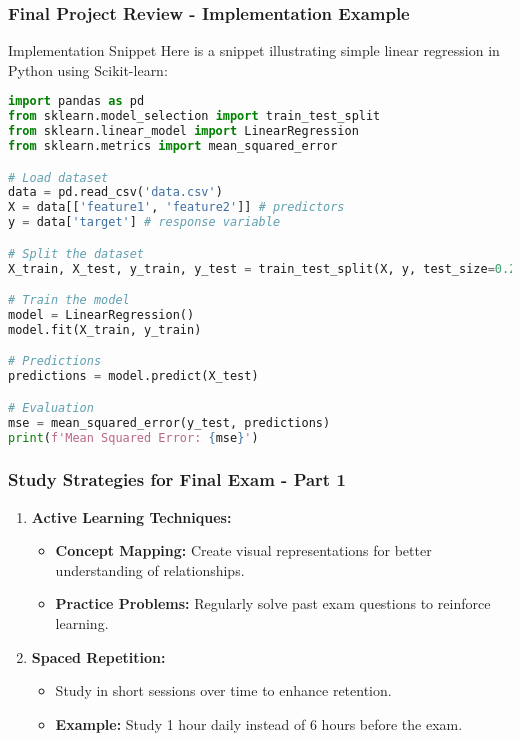 \documentclass{beamer}
\begin{document}
\begin{frame}[fragile]
    \frametitle{Final Project Review - Implementation Example}
    \begin{block}{Implementation Snippet}
        Here is a snippet illustrating simple linear regression in Python using Scikit-learn:
    \end{block}
    \begin{lstlisting}[language=Python]
import pandas as pd
from sklearn.model_selection import train_test_split
from sklearn.linear_model import LinearRegression
from sklearn.metrics import mean_squared_error

# Load dataset
data = pd.read_csv('data.csv')
X = data[['feature1', 'feature2']] # predictors
y = data['target'] # response variable

# Split the dataset
X_train, X_test, y_train, y_test = train_test_split(X, y, test_size=0.2)

# Train the model
model = LinearRegression()
model.fit(X_train, y_train)

# Predictions
predictions = model.predict(X_test)

# Evaluation
mse = mean_squared_error(y_test, predictions)
print(f'Mean Squared Error: {mse}')
    \end{lstlisting}
\end{frame}

\begin{frame}[fragile]
    \frametitle{Study Strategies for Final Exam - Part 1}
    \begin{enumerate}
        \item \textbf{Active Learning Techniques:}
            \begin{itemize}
                \item \textbf{Concept Mapping:} Create visual representations for better understanding of relationships.
                \item \textbf{Practice Problems:} Regularly solve past exam questions to reinforce learning.
            \end{itemize}
        
        \item \textbf{Spaced Repetition:}
            \begin{itemize}
                \item Study in short sessions over time to enhance retention.
                \item \textbf{Example:} Study 1 hour daily instead of 6 hours before the exam.
            \end{itemize}
    \end{enumerate}
\end{frame}
\end{document}

